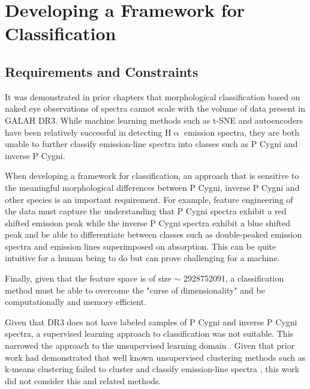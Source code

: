 \chapter{Developing a Framework for Classification}

\section{Requirements and Constraints}

It was demonstrated in prior chapters that morphological classification based on naked eye observations of spectra cannot scale with the volume of data present in GALAH DR3. While machine learning methods such as t-SNE and autoencoders \cite{traven2017galah}\cite{vcotar2021galah} have been relatively successful in detecting H$\upalpha$ emission spectra, they are both unable to further classify emission-line spectra into classes such as P Cygni and inverse P Cygni.

When developing a framework for classification, an approach that is sensitive to the meaningful morphological differences between P Cygni, inverse P Cygni and other species is an important requirement. For example, feature engineering of the data must capture the understanding that P Cygni spectra exhibit a red shifted emission peak while the inverse P Cygni spectra exhibit a blue shifted peak and be able to differentiate between classes such as double-peaked emission spectra and emission lines superimposed on absorption. This can be quite intuitive for a human being to do but can prove challenging for a machine. 

Finally, given that the feature space is of size $\sim$ \num[round-precision=2,round-mode=figures, scientific-notation=true]{2928752091}, a classification method must be able to overcome the "curse of dimensionality" and be computationally and memory efficient. 

Given that DR3 does not have labeled samples of P Cygni and inverse P Cygni spectra, a supervised learning approach to classification was not suitable. This narrowed the approach to the unsupervised learning domain \cite{hastie2009elements}. Given that prior work had demonstrated that well known unsupervised clustering methods such as k-means clustering failed to cluster and classify emission-line spectra \cite{garcia2018machine}, this work did not consider this and related methods. 

